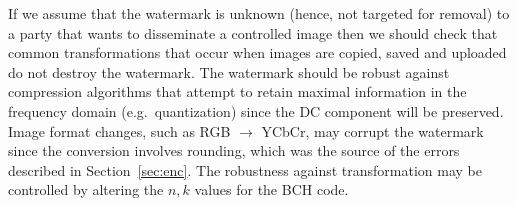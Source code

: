 If we assume that the watermark is unknown (hence, not targeted for removal) to a party that wants to disseminate a controlled image then we should check that common transformations that occur when images are copied, saved and uploaded do not destroy the watermark.
The watermark should be robust against compression algorithms that attempt to retain maximal information in the frequency domain (e.g.\ quantization) since the DC component will be preserved.
Image format changes, such as RGB $\rightarrow$ YCbCr, may corrupt the watermark since the conversion involves rounding, which was the source of the errors described in Section~\ref{sec:enc}.
The robustness against transformation may be controlled by altering the $n,k$ values for the BCH code.
